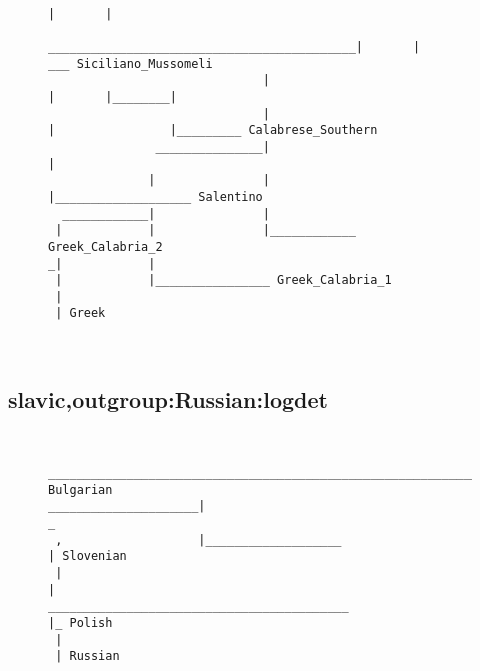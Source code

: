 \begin{figure}[H]
\begin{center}
{\begin{verbatim}
                                                                          |       |
                               ___________________________________________|       |         ___ Siciliano_Mussomeli
                              |                                           |       |________|
                              |                                           |                |_________ Calabrese_Southern
               _______________|                                           |
              |               |                                           |___________________ Salentino
  ____________|               |
 |            |               |____________ Greek_Calabria_2
_|            |
 |            |________________ Greek_Calabria_1
 |
 | Greek



\end{verbatim}
}
\label{...}
\end{center}
\end{figure}
\subsection{slavic,outgroup:Russian:logdet}
\begin{figure}[H]
\begin{center}
{
\selectfont
\begin{verbatim}

                      _______________________________________________________________________________________________________________________________ Bulgarian
_____________________|                                                                                                                               _
 ,                   |___________________                                                                                                           | Slovenian
 |                                                                                                                                                  |
__________________________________________                                                                                                          |_ Polish
 |
 | Russian



\end{verbatim}
}
\label{...}
\end{center}
\end{figure}
